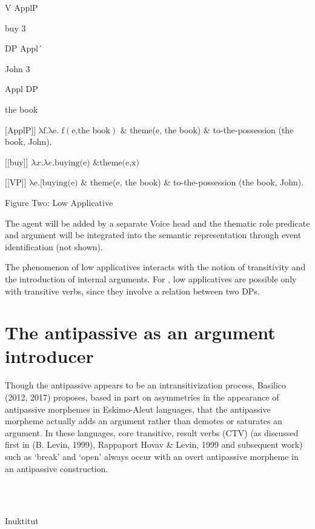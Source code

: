 \documentclass[output=paper,modfonts,nonflat]{langsci/langscibook}
\begin{document}
    V       ApplP

   buy   3

 DP      Appl´

John    3

Appl       DP

the book

[ApplP]]   $\text{λf.λe}\text{. f}\left(\text{e,the book}\right)\text{ \&} $ theme(e, the book) \& to-the-possession (the book, John).

[[buy]]   $\lambda \mathit{x.}\lambda \mathit{e.}\text{buying(e) \& theme(e,x)}$  

[[VP]]   $\text{λe}\text{.[}\text{buying(e) \&} $ theme(e, the book) \& to-the-possession (the book, John).

\begin{stylecaption}
Figure Two: Low Applicative
\end{stylecaption}

The agent will be added by a separate Voice head and the thematic role predicate and argument will be integrated into the semantic representation through event identification (not shown).

The phenomenon of low applicatives interacts with the notion of transitivity and the introduction of internal arguments.  For \citet{Pyllkänen2008}, low applicatives are possible only with transitive verbs, since they involve a relation between two DPs.

\section{The antipassive as an argument introducer} %

Though the antipassive appears to be an intransitivization process, Basilico (2012, 2017) proposes, based in part on asymmetries in the appearance of antipassive morphemes in Eskimo-Aleut languages, that the antipassive morpheme actually adds an argument rather than demotes or saturates an argument. In these languages, core transitive, result verbs (CTV) (as discussed first in (B. Levin, 1999), Rappaport Hovav \& Levin, 1999 and subsequent work) such as ‘break’ and ‘open’ always occur with an overt antipassive morpheme in an antipassive construction. 

\ea%
    \label{ex:key:3}
    \gll\\
        \\
    \glt
    \z

           Inuktitut \citep{Spreng2012}
\end{document}
